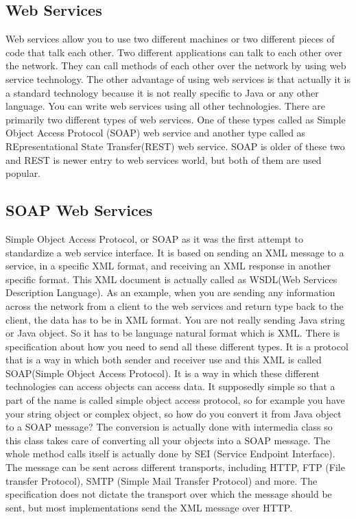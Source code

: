 \documentclass[runningheads,a4paper]{llncs}
\begin{document}
\subsection{Web Services}
Web services allow you to use two different machines or two different pieces of code that talk each other. Two different applications can talk to each other over the network. They can call methods of each other over the network by using web service technology. The other advantage of using web services is that actually it is a standard technology because it is not really specific to Java or any other language. You can write web services using all other technologies. There are primarily two different types of web services. One of these types called as Simple Object Access Protocol (SOAP) web service and another type called as REpresentational State Transfer(REST) web service. SOAP is older of these two and REST is newer entry to web services world, but both of them are used popular.

\subsection{SOAP Web Services}

Simple Object Access Protocol, or SOAP as it was the first attempt to standardize a web service interface. It is based on sending an XML message to a service, in a specific XML format, and receiving an XML response in another specific format. This XML document is actually called as WSDL(Web Services Description Language)\cite{state3}. As an example, when you are sending any information across the network from a client to the web services and return type back to the client, the data has to be in XML format. You are not really sending Java string or Java object. So it has to be language natural format which is XML. There is specification about how you need to send all these different types. It is a protocol that is a way in which both sender and receiver use and this XML is called SOAP(Simple Object Access Protocol). It is a way in which these different technologies can access objects can access data. It supposedly simple so that a part of the name is called simple object access protocol, so for example you have your string object or complex object, so how do you convert it from Java object to a SOAP message? The conversion is actually done with intermedia class so this class takes care of converting all your objects into a SOAP message. The whole method calls itself is actually done by SEI (Service Endpoint Interface)\cite{state5}. The message can be sent across different transports, including HTTP, FTP (File transfer Protocol), SMTP (Simple Mail Transfer Protocol) and more\cite{state2}. The specification does not dictate the transport over which the message should be sent, but most implementations send the XML message over HTTP.
\end{document}
